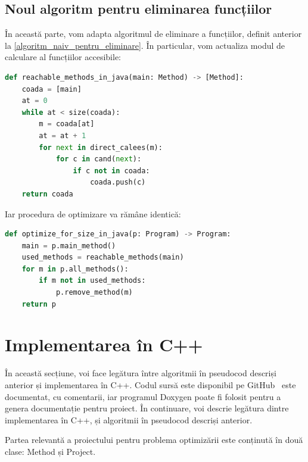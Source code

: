 \subsection{Noul algoritm pentru eliminarea funcțiilor}

În această parte, vom adapta algoritmul de eliminare a funcțiilor, definit
anterior la \ref{algoritm_naiv_pentru_eliminare}.
În particular, vom actualiza modul de calculare al funcțiilor accesibile:

\begin{lstlisting}[language=Python, label=reachable_methods_in_java]
def reachable_methods_in_java(main: Method) -> [Method]:
    coada = [main]
    at = 0
    while at < size(coada):
        m = coada[at]
        at = at + 1
        for next in direct_calees(m):
            for c in cand(next):
                if c not in coada:
                    coada.push(c)
    return coada
\end{lstlisting}


Iar procedura de optimizare va rămâne identică:

\begin{lstlisting}[language=Python, label=optimize_for_size_in_java]
def optimize_for_size_in_java(p: Program) -> Program:
    main = p.main_method()
    used_methods = reachable_methods(main)
    for m in p.all_methods():
        if m not in used_methods:
            p.remove_method(m)
    return p
\end{lstlisting}

\section{Implementarea în C++}

În această secțiune, voi face legătura între algoritmii în pseudocod descriși
anterior și implementarea în C++.
Codul sursă este disponibil pe GitHub~\cite{project_sourcecode} este documentat,
cu comentarii, iar programul Doxygen poate fi folosit pentru a genera
documentație pentru proiect.
În continuare, voi descrie legătura dintre implementarea în C++, și
algoritmii în pseudocod descriși anterior.

Partea relevantă a proiectului pentru problema optimizării este conținută în
două clase: Method și Project.

